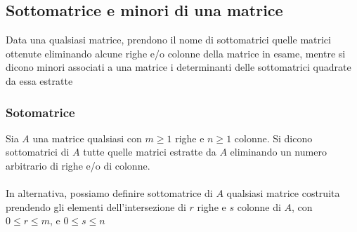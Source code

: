 \documentclass{report}
\begin{document}
\subsection{Sottomatrice e minori di una matrice}

Data una qualsiasi matrice, prendono il nome di sottomatrici quelle matrici ottenute eliminando alcune righe e/o colonne della matrice in esame, mentre si dicono minori associati a una matrice i determinanti delle sottomatrici quadrate da essa estratte

\subsubsection{Sotomatrice}
Sia $A$ una matrice qualsiasi con $m \ge 1$ righe e $n \ge 1$ colonne. Si dicono sottomatrici di $A$ tutte quelle matrici estratte da $A$ eliminando un numero arbitrario di righe e/o di colonne.
\\
\\
In alternativa, possiamo definire sottomatrice di $A$ qualsiasi matrice costruita prendendo gli elementi dell'intersezione di $r$ righe e $s$ colonne di $A$, con $0 \le r \le m$, e $0 \le s \le n$

\end{document}
